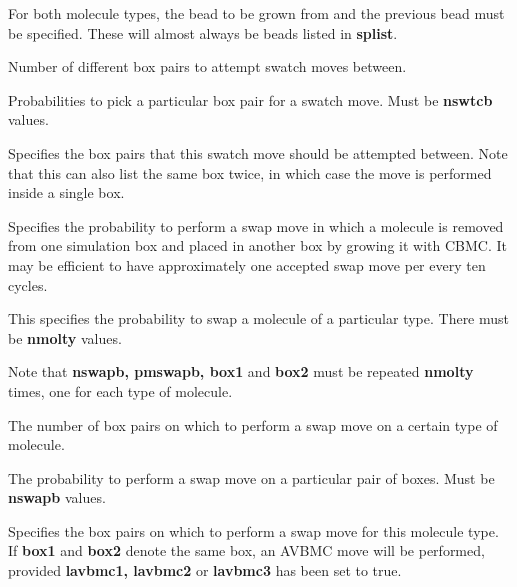 \documentclass[12pt,letterpaper]{article}
\begin{document}
{ For both molecule types, the
bead to be grown from and the previous bead must be specified.  These
will almost always be beads listed in {\textbf {splist}}.

 Number of different box pairs to attempt swatch
moves between.

 Probabilities to pick a particular box pair for
a swatch move.  Must be {\textbf {nswtcb}} values.

 Specifies the box pairs that this swatch move
should be attempted between.  Note that this can also list the same
box twice, in which case the move is performed inside a single box.

 Specifies the probability to perform a swap
move in which a molecule is removed from one simulation box and placed 
in another box by growing it with CBMC.  It may be efficient to have approximately
one accepted swap move per every ten cycles.

 This specifies the probability to swap a molecule of 
a particular type.  There must be {\textbf{nmolty}} values.

\noindent Note that {\textbf{nswapb, pmswapb, box1}} and {\textbf{box2}} must be
repeated {\textbf{nmolty}} times, one for each type of molecule.

 The number of box pairs on which to perform a swap
move on a certain type of molecule.  

 The probability to perform a swap move on a
particular pair of boxes.  Must be {\textbf {nswapb}} values.

 Specifies the box pairs on which to perform a swap
move for this molecule type.  If {\textbf{box1}} and {\textbf{box2}} denote the same box, 
an AVBMC move will be performed, provided {\textbf {lavbmc1, lavbmc2}} 
or {\textbf {lavbmc3}} has been set to true.

}
\end{document}
